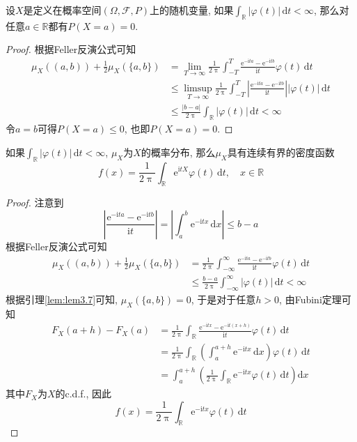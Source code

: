 \documentclass[cn, 12pt, math=mtpro2, bibstyle=apa, blue, twocol]{elegantbook}
\newcommand{\F}{\mathcal{F}}
\newcommand{\R}{\mathbb{R}}
\newcommand{\itx}{\text{e}^{\text{i}tX}}
\begin{document}
\begin{lemma}\label{lem:lem3.7}
设$X$是定义在概率空间$(\Omega,\F,P)$上的随机变量, 如果$\int_\R|\varphi(t)|\,\text{d}t<\infty$, 那么对任意$a\in\R$都有$P(X=a)=0$.
\end{lemma}
\begin{proof}
  根据Feller反演公式可知
  \begin{align*}
  \mu_X((a,b))+\frac{1}{2}\mu_X(\{a,b\})&=\lim_{T\to\infty}\frac{1}{2\uppi}\int_{-T}^{T}\frac{\text{e}^{-\text{i}ta}-\text{e}^{-\text{i}tb}}{\text{i}t}\varphi(t)\,\text{d}t \\
  &\leq \limsup_{T\to\infty}\frac{1}{2\uppi}\int_{-T}^{T}\left|\frac{\text{e}^{-\text{i}ta}-\text{e}^{-\text{i}tb}}{\text{i}t}\right||\varphi(t)|\,\text{d}t \\
  &\leq\frac{|b-a|}{2\uppi}\int_\R|\varphi(t)|\,\text{d}t<\infty
  \end{align*}
  令$a=b$可得$P(X=a)\leq 0$, 也即$P(X=a)=0$.
\end{proof}
\begin{theorem}\label{thm:thm3.8}
如果$\int_\R|\varphi(t)|\,\text{d}t<\infty$, $\mu_X$为$X$的概率分布, 那么$\mu_X$具有连续有界的密度函数
$$f(x)=\frac{1}{2\uppi}\int_\R \itx\varphi(t)\,\text{d}t,\quad x\in\R$$
\end{theorem}
\begin{proof}
  注意到
  $$\left|\frac{\text{e}^{-\text{i}ta}-\text{e}^{-\text{i}tb}}{\text{i}t}\right|=\left|\int_{a}^{b}\text{e}^{-\text{i}tx}\,\text{d}x\right|\leq b-a$$
  根据Feller反演公式可知
  \begin{align*}
  \mu_X((a,b))+\frac{1}{2}\mu_X(\{a,b\})&=\frac{1}{2\uppi}\int_{-\infty}^{\infty}\frac{\text{e}^{-\text{i}ta}-\text{e}^{-\text{i}tb}}{\text{i}t}\varphi(t)\,\text{d}t \\
  &\leq\frac{b-a}{2\uppi}\int_{-\infty}^{\infty}|\varphi(t)|\,\text{d}t<\infty
  \end{align*}
  根据引理\ref{lem:lem3.7}可知, $\mu_X(\{a,b\})=0$, 于是对于任意$h>0$, 由Fubini定理可知
  \begin{align*}
  F_X(a+h)-F_X(a)&=\frac{1}{2\uppi}\int_\R\frac{\text{e}^{-\text{i}tx}-\text{e}^{-\text{i}t(x+h)}}{\text{i}t}\varphi(t)\,\text{d}t \\
  &=\frac{1}{2\uppi}\int_\R\left(\int_{a}^{a+h}\text{e}^{-\text{i}tx}\,\text{d}x\right)\varphi(t)\,\text{d}t \\
  &=\int_{a}^{a+h}\left(\frac{1}{2\uppi}\int_\R \text{e}^{-\text{i}tx}\varphi(t)\,\text{d}t\right)\text{d}x
  \end{align*}
  其中$F_X$为$X$的c.d.f., 因此
  $$f(x)=\frac{1}{2\uppi}\int_\R \text{e}^{-\text{i}tx}\varphi(t)\,\text{d}t$$

\end{proof}
\end{document}
